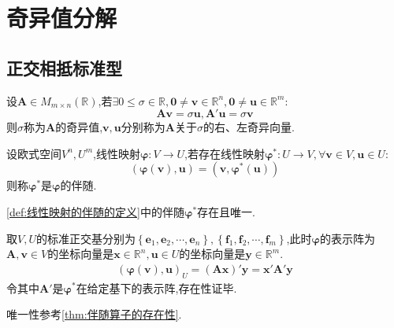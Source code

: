 \section{奇异值分解}
\subsection{正交相抵标准型}
\begin{formal}
    \begin{definition}[奇异值和奇异向量的定义]\label{def:奇异值和奇异向量的定义}
        设$\bm{A}\in M_{m\times n}\left(\mathbb{R}\right)$,若$\exists0\leqslant\sigma\in\mathbb{R},\bm{0}\neq\bm{v}\in\mathbb{R}^n,\bm{0}\neq\bm{u}\in\mathbb{R}^m:$\[
        \bm{Av}=\sigma\bm{u},\bm{A}'\bm{u}=\sigma\bm{v}
        \]则$\sigma$称为$\bm{A}$的奇异值,$\bm{v},\bm{u}$分别称为$\bm{A}$关于$\sigma$的右、左奇异向量.
    \end{definition}
\end{formal}
\begin{formal}
    \begin{definition}[线性映射的伴随的定义]\label{def:线性映射的伴随的定义}
        设欧式空间$V^n,U^m$,线性映射$\bm{\varphi}:V\longrightarrow U$,若存在线性映射$\bm{\varphi}^*:U\longrightarrow V,\forall\bm{v}\in V,\bm{u}\in U:$\[
        \left(
            \bm{\varphi}\left(\bm{v}\right),\bm{u}
        \right)=\left(
            \bm{v},\bm{\varphi}^*\left(\bm{u}\right)
        \right)
        \]则称$\bm{\varphi}^*$是$\bm{\varphi}$的伴随.
    \end{definition}
\end{formal}
\begin{formal}
    \begin{proposition}[伴随的存在性]\label{prop:伴随的存在性}
        \cref{def:线性映射的伴随的定义}中的伴随$\bm{\varphi}^*$存在且唯一.
    \end{proposition}
    \begin{Proof}
        取$V,U$的标准正交基分别为$\left\{
            \bm{e}_1,\bm{e}_2,\cdots,\bm{e}_n
        \right\},\left\{
            \bm{f}_1,\bm{f}_2,\cdots,\bm{f}_m
        \right\}$,此时$\bm{\varphi}$的表示阵为$\bm{A},\bm{v}\in V$的坐标向量是$\bm{x}\in\mathbb{R}^n,\bm{u}\in U$的坐标向量是$\bm{y}\in\mathbb{R}^m$.\begin{align*}
            \left(
                \bm{\varphi}\left(\bm{v}\right),\bm{u}
            \right)_U=\left(\bm{Ax}\right)'\bm{y}=\bm{x}'\bm{A}'\bm{y}
        \end{align*}令其中$\bm{A}'$是$\bm{\varphi}^*$在给定基下的表示阵,存在性证毕.

        唯一性参考\cref{thm:伴随算子的存在性}.
    \end{Proof}
\end{formal}
